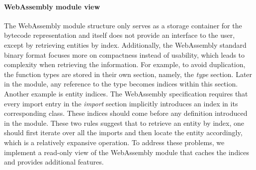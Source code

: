 \paragraph{WebAssembly module view}
The WebAssembly module structure only serves as a storage container for the
bytecode representation and itself does not provide an interface to the user,
except by retrieving entities by index. Additionally, the WebAssembly standard
binary format focuses more on compactness instead of usability, which leads to
complexity when retrieving the information. For example, to avoid duplication,
the function types are stored in their own section, namely, the \emph{type}
section. Later in the module, any reference to the type becomes indices within
this section. Another example is entity indices. The WebAssembly specification
requires that every import entry in the \emph{import} section implicitly
introduces an index in its corresponding class. These indices should come
before any definition introduced in the module. These two rules suggest that to
retrieve an entity by index, one should first iterate over all the imports and
then locate the entity accordingly, which is a relatively expansive operation.
To address these problems, we implement a read-only view of the WebAssembly
module that caches the indices and provides additional features.


